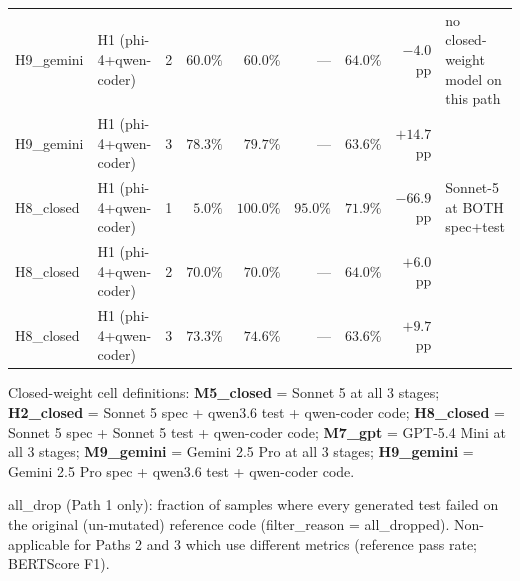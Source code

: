 \begin{table}[!htbp]
\begin{tabular*}{\textwidth}{@{\extracolsep{\fill}}llcrrrrrp{3.0cm}@{}}
    H9\_gemini & H1 (phi-4+qwen-coder) & 2 & $60.0\%$        & $60.0\%$  &    ---   & $64.0\%$ & $-4.0$~pp  & no closed-weight model on this path \\
    H9\_gemini & H1 (phi-4+qwen-coder) & 3 & $78.3\%$        & $79.7\%$  &    ---   & $63.6\%$ & $+14.7$~pp & \\
    \midrule
    H8\_closed & H1 (phi-4+qwen-coder) & 1 & $\phantom{0}5.0\%$ & $100.0\%$ & $95.0\%$ & $71.9\%$ & $-66.9$~pp & Sonnet-5 at BOTH spec+test \\
    H8\_closed & H1 (phi-4+qwen-coder) & 2 & $70.0\%$        & $70.0\%$  &    ---   & $64.0\%$ & $+6.0$~pp  & \\
    H8\_closed & H1 (phi-4+qwen-coder) & 3 & $73.3\%$        & $74.6\%$  &    ---   & $63.6\%$ & $+9.7$~pp  & \\
    \bottomrule
  \end{tabular*}

  \vspace{3pt}
  \raggedright\footnotesize
  Closed-weight cell definitions: \textbf{M5\_closed} = Sonnet 5 at all 3 stages; \textbf{H2\_closed} = Sonnet 5 spec + qwen3.6 test + qwen-coder code; \textbf{H8\_closed} = Sonnet 5 spec + Sonnet 5 test + qwen-coder code; \textbf{M7\_gpt} = GPT-5.4 Mini at all 3 stages; \textbf{M9\_gemini} = Gemini 2.5 Pro at all 3 stages; \textbf{H9\_gemini} = Gemini 2.5 Pro spec + qwen3.6 test + qwen-coder code.
  \par
  all\_drop (Path 1 only): fraction of samples where every generated test failed on the original (un-mutated) reference code (filter\_reason = \textsf{all\_dropped}). Non-applicable for Paths 2 and 3 which use different metrics (reference pass rate; BERTScore F1).
\end{table}